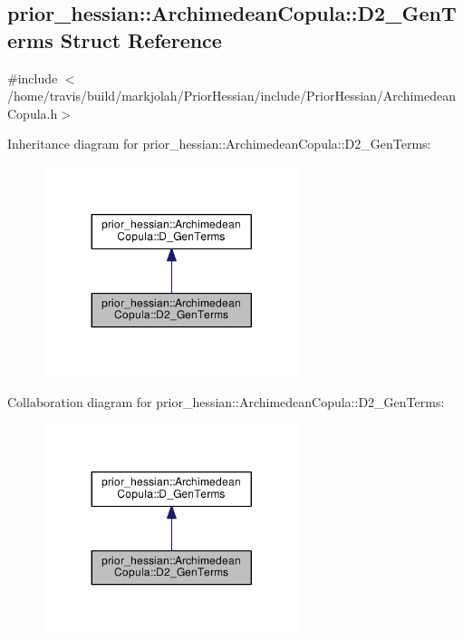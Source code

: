 \hypertarget{structprior__hessian_1_1ArchimedeanCopula_1_1D2__GenTerms}{}\subsection{prior\+\_\+hessian\+:\+:Archimedean\+Copula\+:\+:D2\+\_\+\+Gen\+Terms Struct Reference}
\label{structprior__hessian_1_1ArchimedeanCopula_1_1D2__GenTerms}


{\ttfamily \#include $<$/home/travis/build/markjolah/\+Prior\+Hessian/include/\+Prior\+Hessian/\+Archimedean\+Copula.\+h$>$}



Inheritance diagram for prior\+\_\+hessian\+:\+:Archimedean\+Copula\+:\+:D2\+\_\+\+Gen\+Terms\+:\nopagebreak
\begin{figure}[H]
\begin{center}
\leavevmode
\includegraphics[width=212pt]{structprior__hessian_1_1ArchimedeanCopula_1_1D2__GenTerms__inherit__graph}
\end{center}
\end{figure}


Collaboration diagram for prior\+\_\+hessian\+:\+:Archimedean\+Copula\+:\+:D2\+\_\+\+Gen\+Terms\+:\nopagebreak
\begin{figure}[H]
\begin{center}
\leavevmode
\includegraphics[width=212pt]{structprior__hessian_1_1ArchimedeanCopula_1_1D2__GenTerms__coll__graph}
\end{center}
\end{figure}
